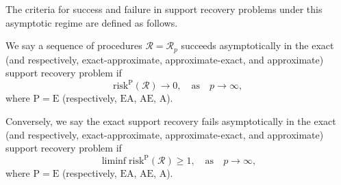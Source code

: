 The criteria for success and failure in support recovery problems under this asymptotic regime are defined as follows.
\begin{definition} \label{def:exact-recovery-success-failure}
We say a sequence of procedures $\mathcal{R} = \mathcal{R}_p$ succeeds asymptotically in the exact (and respectively, exact-approximate, approximate-exact, and approximate) support recovery problem if 
\begin{equation} \label{eq:support-recovery-success}
    \mathrm{risk}^{\mathrm{P}}(\mathcal{R}) \to 0, \quad \text{as}\quad p\to\infty,
\end{equation}
where $\mathrm{P}=\mathrm{E}$ (respectively, $\mathrm{EA}$, $\mathrm{AE}$, $\mathrm{A}$).

Conversely, we say the exact support recovery fails asymptotically in the exact (and respectively, exact-approximate, approximate-exact, and approximate) support recovery problem if 
\begin{equation} \label{eq:support-recovery-faliure}
    \liminf\mathrm{risk}^{\mathrm{P}}(\mathcal{R}) \ge 1, \quad \text{as}\quad p\to\infty,
\end{equation}
where $\mathrm{P}=\mathrm{E}$ (respectively, $\mathrm{EA}$, $\mathrm{AE}$, $\mathrm{A}$).
\end{definition}


